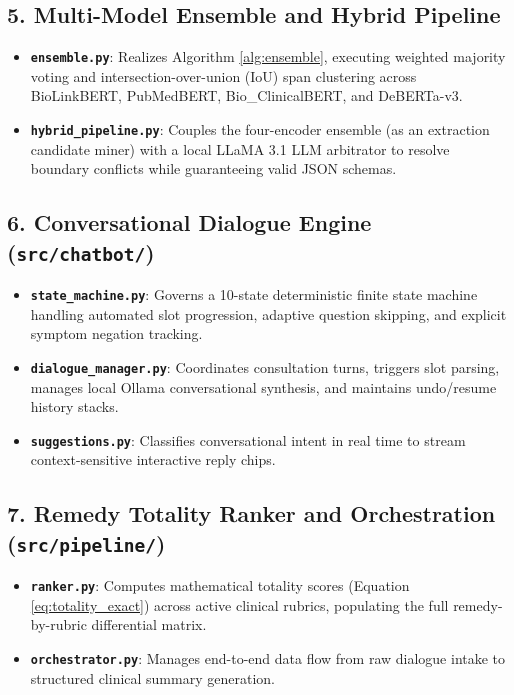 \subsection{5. Multi-Model Ensemble and Hybrid Pipeline}
\begin{itemize}
  \item \textbf{\texttt{ensemble.py}}: Realizes Algorithm \ref{alg:ensemble}, executing weighted majority voting and intersection-over-union (IoU) span clustering across BioLinkBERT, PubMedBERT, Bio\_ClinicalBERT, and DeBERTa-v3.
  \item \textbf{\texttt{hybrid\_pipeline.py}}: Couples the four-encoder ensemble (as an extraction candidate miner) with a local LLaMA 3.1 LLM arbitrator to resolve boundary conflicts while guaranteeing valid JSON schemas.
\end{itemize}

\subsection{6. Conversational Dialogue Engine (\texttt{src/chatbot/})}
\begin{itemize}
  \item \textbf{\texttt{state\_machine.py}}: Governs a 10-state deterministic finite state machine handling automated slot progression, adaptive question skipping, and explicit symptom negation tracking.
  \item {\raggedright \textbf{\texttt{dialogue\_manager.py}}: Coordinates consultation turns, triggers slot parsing, manages local Ollama conversational synthesis, and maintains undo/resume history stacks.\par}
  \item \textbf{\texttt{suggestions.py}}: Classifies conversational intent in real time to stream context-sensitive interactive reply chips.
\end{itemize}

\subsection{7. Remedy Totality Ranker and Orchestration (\texttt{src/pipeline/})}
\begin{itemize}
  \item \textbf{\texttt{ranker.py}}: Computes mathematical totality scores (Equation \ref{eq:totality_exact}) across active clinical rubrics, populating the full remedy-by-rubric differential matrix.
  \item \textbf{\texttt{orchestrator.py}}: Manages end-to-end data flow from raw dialogue intake to structured clinical summary generation.
\end{itemize}


